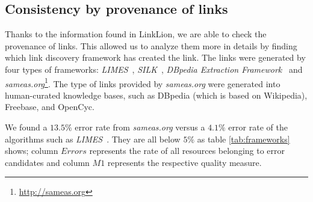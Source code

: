 
\subsection{Consistency by provenance of links}
Thanks to the information found in LinkLion, we are able to check the provenance of links. This allowed us to analyze them more in details by finding which link discovery framework has created the link. The links were generated by four types of frameworks: \textit{LIMES}~\cite{ngomo2011limes}, \textit{SILK}~\cite{volz2009silk},  \textit{DBpedia Extraction Framework}~\cite{lehmann2015dbpedia} and \textit{sameas.org}\footnote{\url{http://sameas.org}}. The type of links provided by \textit{sameas.org} were generated into human-curated knowledge bases, such as DBpedia (which is based on Wikipedia), Freebase, and OpenCyc.

We found a $13.5\%$ error rate from \textit{sameas.org} versus a $4.1\%$ error rate of the algorithms such as \textit{LIMES}~\cite{ngomo2011limes}. They are all below $5\%$ as table \ref{tab:frameworks} shows; column $Errors$ represents the rate of all resources belonging to error candidates and column $M1$ represents the respective quality measure. 

